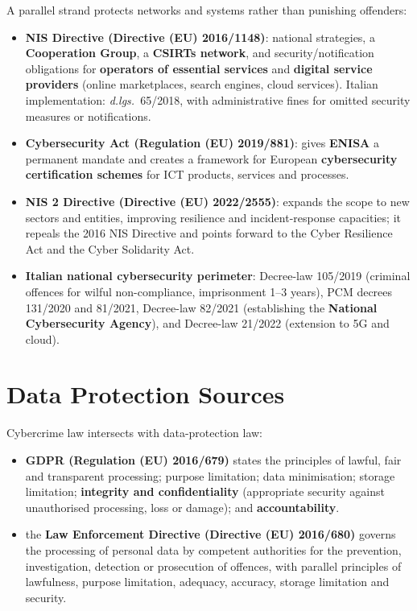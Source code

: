 \documentclass[11pt,a4paper,openany]{report}
\theoremstyle{definition}
\theoremstyle{plain}
\theoremstyle{remark}
\begin{document}
A parallel strand protects networks and systems rather than punishing offenders:
\begin{itemize}
    \item \textbf{NIS Directive (Directive (EU) 2016/1148)}: national strategies, a \textbf{Cooperation Group}, a \textbf{CSIRTs network}, and security/notification obligations for \textbf{operators of essential services} and \textbf{digital service providers} (online marketplaces, search engines, cloud services). Italian implementation: \emph{d.lgs.}\ 65/2018, with administrative fines for omitted security measures or notifications.
    \item \textbf{Cybersecurity Act (Regulation (EU) 2019/881)}: gives \textbf{ENISA} a permanent mandate and creates a framework for European \textbf{cybersecurity certification schemes} for ICT products, services and processes.
    \item \textbf{NIS 2 Directive (Directive (EU) 2022/2555)}: expands the scope to new sectors and entities, improving resilience and incident-response capacities; it repeals the 2016 NIS Directive and points forward to the Cyber Resilience Act and the Cyber Solidarity Act.
    \item \textbf{Italian national cybersecurity perimeter}: Decree-law 105/2019 (criminal offences for wilful non-compliance, imprisonment 1--3 years), PCM decrees 131/2020 and 81/2021, Decree-law 82/2021 (establishing the \textbf{National Cybersecurity Agency}), and Decree-law 21/2022 (extension to 5G and cloud).
\end{itemize}

\section{Data Protection Sources}

Cybercrime law intersects with data-protection law:
\begin{itemize}
    \item \textbf{GDPR (Regulation (EU) 2016/679)} states the principles of lawful, fair and transparent processing; purpose limitation; data minimisation; storage limitation; \textbf{integrity and confidentiality} (appropriate security against unauthorised processing, loss or damage); and \textbf{accountability}.
    \item the \textbf{Law Enforcement Directive (Directive (EU) 2016/680)} governs the processing of personal data by competent authorities for the prevention, investigation, detection or prosecution of offences, with parallel principles of lawfulness, purpose limitation, adequacy, accuracy, storage limitation and security.
\end{itemize}
\end{document}
